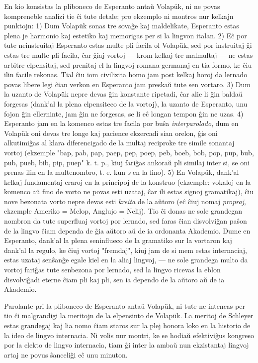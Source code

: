 \enlargethispage{-\baselineskip}
   En kio konsistas la pliboneco de Esperanto anta\u u Volap\"uk, ni
ne povas kompreneble analizi tie \^ci tute detale; pro ekzemplo ni
montros nur kelkajn punktojn: 1) Dum Volap\"uk sonas tre sova\^ge
kaj maldelikate, Esperanto estas plena je harmonio kaj estetiko kaj
memorigas per si la lingvon italan. 2) E\^c por tute neinstruitaj
Esperanto estas multe pli facila ol Volap\"uk, sed por instruitaj
\^gi estas tre multe pli facila, \^car \^giaj vortoj --- krom kelkaj
tre malmultaj --- ne estas arbitre elpensitaj, sed prenitaj el la
lingvoj romana-germanaj en tia formo, ke \^ciu ilin facile rekonas.
Tial \^ciu iom civilizita homo jam post kelkaj horoj da lernado
povas libere legi \^cian verkon en Esperanto jam preska\u u tute sen
vortaro. 3) Dum la uzanto de Volap\"uk nepre devas \^gin konstante
ripetadi, \^car alie li \^gin balda\u u forgesas (dank'al la plena
elpensiteco de la vortoj), la uzanto de Esperanto, unu fojon \^gin
ellerninte, jam \^gin ne forgesas, se li e\^c longan tempon \^gin ne
uzas. 4) Esperanto jam en la komenco estas tre facila por bu\^sa
{\sl interparolado}, dum en Volap\"uk oni devas tre longe kaj
pacience ekzercadi sian orelon, \^gis oni alkutimi\^gas al klara
diferencigado de la multaj reciproke tre simile sonantaj vortoj
(ekzemple "bap, pab, pap, paep, pep, poep, peb, boeb, bob, pop,
pup, bub, pub, pueb, bib, pip, puep" k. t. p., kiuj fari\^gas
ankora\u u pli similaj inter si, se oni prenas ilin en la
multenombro, t. e. kun {\sl s} en la fino). 5) En Volap\"uk, dank'al
kelkaj fundamentaj eraroj en la principoj de la konstruo (ekzemple:
vokaloj en la komenco a\u u fino de vorto ne povas esti uzataj,
\^car ili estas signoj gramatikaj), \^ciu nove bezonata vorto nepre
devas esti {\sl kreita} de la a\u utoro (e\^c \^ciuj nomaj {\sl
propraj}, ekzemple Ameriko = Melop, Anglujo = Nelij). Tio \^ci donas
ne sole grandegan nombron da tute superfluaj vortoj por lernado, sed
faras \^cian disvolvi\^gan pa\^son de la lingvo \^ciam dependa de
\^gia a\u utoro a\u u de ia ordonanta Akademio. Dume en Esperanto,
dank'al la plena seninflueco de la gramatiko sur la vortaron kaj
dank'al la regulo, ke \^ciuj vortoj "fremdaj", kiuj jam de si mem
estas internaciaj, estas uzataj sen\^san\^ge egale kiel en la aliaj
lingvoj, --- ne sole grandega multo da vortoj fari\^gas tute
senbezona por lernado, sed la lingvo ricevas la eblon disvolvi\^gadi
eterne \^ciam pli kaj pli, sen ia dependo de la a\u utoro a\u u de
ia Akademio.

   Parolante pri la pliboneco de Esperanto anta\u u Volap\"uk, ni tute
ne intencas per tio \^ci malgrandigi la meritojn de la elpensinto de
Volap\"uk. La meritoj de Schleyer estas grandegaj kaj lia nomo
\^ciam staros sur la plej honora loko en la historio de la ideo de
lingvo internacia. Ni volis nur montri, ke se hodia\u u
efektivi\^gus kongreso por la elekto de lingvo internacia, tiam \^gi
inter la amba\u u nun ekzistantaj lingvoj artaj ne povus
\^sanceli\^gi e\^c unu minuton.

